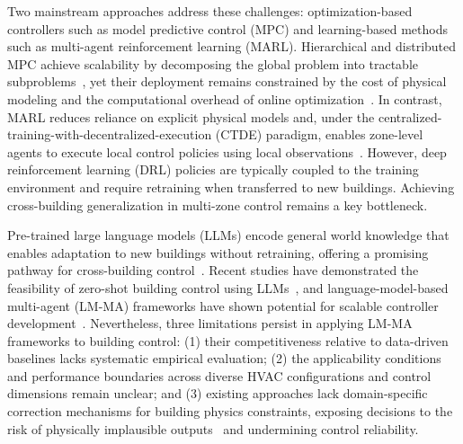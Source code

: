 \documentclass[a4paper]{cas-sc}
\begin{document}
Two mainstream approaches address these challenges: optimization-based controllers such as model predictive control (MPC) and learning-based methods such as multi-agent reinforcement learning (MARL). Hierarchical and distributed MPC achieve scalability by decomposing the global problem into tractable subproblems~\cite{Rawlings2018-kk,Morosan2010-nd}, yet their deployment remains constrained by the cost of physical modeling and the computational overhead of online optimization~\cite{Drgo2020-faiel}. In contrast, MARL reduces reliance on explicit physical models and, under the centralized-training-with-decentralized-execution (CTDE) paradigm, enables zone-level agents to execute local control policies using local observations~\cite{Jendoubi2023-ak}. However, deep reinforcement learning (DRL) policies are typically coupled to the training environment and require retraining when transferred to new buildings. Achieving cross-building generalization in multi-zone control remains a key bottleneck.

Pre-trained large language models (LLMs) encode general world knowledge that enables adaptation to new buildings without retraining, offering a promising pathway for cross-building control~\cite{Shinn2023-ae}. Recent studies have demonstrated the feasibility of zero-shot building control using LLMs~\cite{Liu2025-ql}, and language-model-based multi-agent (LM-MA) frameworks have shown potential for scalable controller development~\cite{Hu2025-jb}. Nevertheless, three limitations persist in applying LM-MA frameworks to building control: (1) their competitiveness relative to data-driven baselines lacks systematic empirical evaluation; (2) the applicability conditions and performance boundaries across diverse HVAC configurations and control dimensions remain unclear; and (3) existing approaches lack domain-specific correction mechanisms for building physics constraints, exposing decisions to the risk of physically implausible outputs~\cite{Geissler2025-je} and undermining control reliability.
\end{document}
